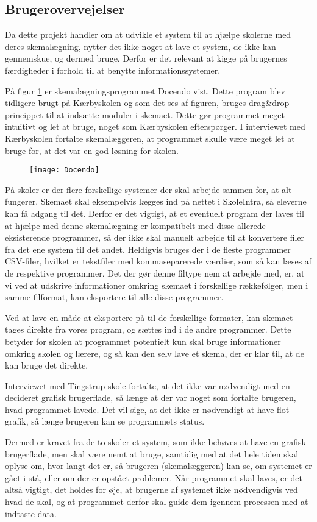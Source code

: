 \subsection{Brugerovervejelser}
\label{brugerovervejelser}
Da dette projekt handler om at udvikle et system til at hjælpe skolerne med deres skemalægning, nytter det ikke noget at lave et system, de ikke kan gennemskue, og dermed bruge. Derfor er det relevant at kigge på brugernes færdigheder i forhold til at benytte informationssystemer.

På figur \ref{fig:docendo_skema} er skemalægningsprogrammet Docendo vist. Dette program blev tidligere brugt på Kærbyskolen og som det ses af figuren, bruges drag\&drop-princippet til at indsætte moduler i skemaet. Dette gør programmet meget intuitivt og let at bruge, noget som Kærbyskolen efterspørger. I interviewet med Kærbyskolen fortalte skemalæggeren, at programmet skulle være meget let at bruge for, at det var en god løsning for skolen.

\begin{figure}[h!]
	\centering
	\texttt{[image: Docendo]}
	\label{fig:docendo_skema}
\end{figure}

På skoler er der flere forskellige systemer der skal arbejde sammen for, at alt fungerer. Skemaet skal eksempelvis lægges ind på nettet i SkoleIntra, så eleverne kan få adgang til det. Derfor er det vigtigt, at et eventuelt program der laves til at hjælpe med denne skemalægning er kompatibelt med disse allerede eksisterende programmer, så der ikke skal manuelt arbejde til at konvertere filer fra det ene system til det andet. Heldigvis bruges der i de fleste programmer CSV-filer, hvilket er tekstfiler med kommaseparerede værdier, som så kan læses af de respektive programmer. Det der gør denne filtype nem at arbejde med, er, at vi ved at udskrive informationer omkring skemaet i forskellige rækkefølger, men i samme filformat, kan eksportere til alle disse programmer.

Ved at lave en måde at eksportere på til de forskellige formater, kan skemaet tages direkte fra vores program, og sættes ind i de andre programmer. Dette betyder for skolen at programmet potentielt kun skal bruge informationer omkring skolen og lærere, og så kan den selv lave et skema, der er klar til, at de kan bruge det direkte.

Interviewet med Tingstrup skole fortalte, at det ikke var nødvendigt med en decideret grafisk brugerflade, så længe at der var noget som fortalte brugeren, hvad programmet lavede. Det vil sige, at det ikke er nødvendigt at have flot grafik, så længe brugeren kan se programmets status. 

Dermed er kravet fra de to skoler et system, som ikke behøves at have en grafisk brugerflade, men skal være nemt at bruge, samtidig med at det hele tiden skal oplyse om, hvor langt det er, så brugeren (skemalæggeren) kan se, om systemet er gået i stå, eller om der er opstået problemer. Når programmet skal laves, er det altså vigtigt, det holdes for øje, at brugerne af systemet ikke nødvendigvis ved hvad de skal, og at programmet derfor skal guide dem igennem processen med at indtaste data.